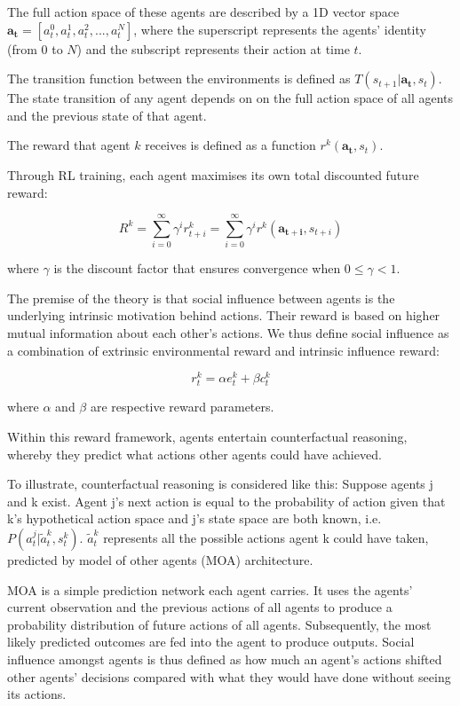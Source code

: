 \documentclass{article}
\begin{document}
The full action space of these agents are described by a 1D vector space $\boldsymbol{a_t}=[a_t^0, a_t^1,a_t^2, ..., a_t^N]$, where the superscript represents the agents' identity (from $0$ to $N$) and the subscript represents their action at time $t$. 

The transition function between the environments is defined as $T(s_{t+1} \vert \boldsymbol{a_t}, s_t)$. The 
state transition of any agent depends on on the full action space of all agents and the previous state of that agent.

The reward that agent $k$ receives is defined as a function $r^k(\boldsymbol{a_t}, s_t)$. 

Through RL training, each agent maximises its own total discounted future reward:

\begin{equation}
    R^k = \sum_{i=0}^{\infty}\gamma^i r_{t+i}^k = \sum_{i=0}^{\infty}\gamma^i r^k(\boldsymbol{a_{t+i}}, s_{t+i})
\end{equation}


where $\gamma$ is the discount factor that ensures convergence when $0\leq \gamma < 1$. 

The premise of the theory is that social influence between agents is the underlying intrinsic motivation behind actions. Their reward is based on higher mutual information about each other's actions. We thus define social influence as a combination of extrinsic environmental reward and intrinsic influence reward: 

\begin{equation}
  r^k_t = \alpha e^k_t + \beta c^k_t 
\end{equation}



where $\alpha$ and $\beta$ are respective reward parameters. 

Within this reward framework, agents entertain counterfactual reasoning, whereby they predict what actions other agents could have achieved. 

To illustrate, counterfactual reasoning is considered like this: Suppose agents j and k exist. Agent j's next action is equal to the probability of action given that k's hypothetical action space and j's state space are both known, i.e. $P(a^j_t \vert \tilde{a}^k_t , s^k_t )$. $\tilde{a}^k_t$ represents all the possible actions agent k could have taken, predicted by model of other agents (MOA) architecture. 

MOA is a simple prediction network each agent carries. It uses the agents' current observation and the previous actions of all agents to produce a probability distribution of future actions of all agents. Subsequently, the most likely predicted outcomes are fed into the agent to produce outputs. Social influence amongst agents is thus defined as how much an agent's actions shifted other agents' decisions compared with what they would have done without seeing its actions. 
\end{document}
